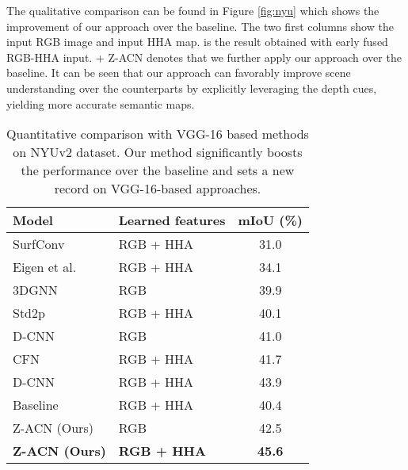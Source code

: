 \documentclass[lettersize,journal]{IEEEtran}
\begin{document}
The qualitative comparison can be found in Figure \ref{fig:nyu} which shows the improvement of our approach over the baseline. The two first columns show the input RGB image and input HHA map.  is the result obtained with early fused RGB-HHA input. + Z-ACN denotes that we further apply our approach over the baseline. It can be seen that our approach can favorably improve scene understanding over the counterparts by explicitly leveraging the depth cues, yielding more accurate semantic maps.



\begin{table}[t]
\centering
\caption{Quantitative comparison with VGG-16 based methods on NYUv2 dataset. Our method significantly boosts the performance over the baseline and sets a new record on VGG-16-based approaches.}

\begin{tabular}[ht]{p{2cm} | p{2.3cm} c} 
\hline

\hline
Model & Learned features & mIoU (\%)  \\
\hline
SurfConv \cite{chu2018surfconv} & RGB + HHA  & 31.0  \\ 
\hline
Eigen et al. \cite{Eigen2015MultiScale} & RGB + HHA & 34.1  \\ 
\hline
3DGNN \cite{Qi2017Graph} & RGB & 39.9  \\ 
\hline
Std2p \cite{he2017std2p} & RGB + HHA & 40.1 \\
\hline
D-CNN \cite{Wang2018DCNN}& RGB & 41.0  \\
\hline
CFN \cite{Lin2017RGBDCascaded} & RGB + HHA & 41.7  \\
\hline
D-CNN \cite{Wang2018DCNN}& RGB + HHA  & 43.9  \\
\hline
\hline
Baseline & RGB + HHA & 40.4 \\
\hline
Z-ACN (Ours)& RGB & 42.5  \\
\hline
\textbf{Z-ACN (Ours)} & \textbf{RGB + HHA } & \textbf{45.6}  \\
\hline

\hline
\end{tabular}

\label{pretrained}
\end{table}
\end{document}
